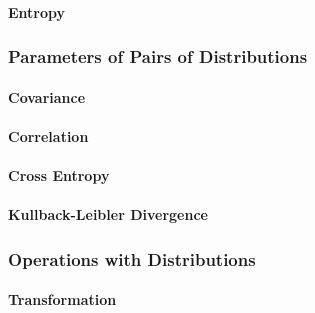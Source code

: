 

\paragraph{Entropy}


\subsubsection{Parameters of Pairs of Distributions}

\paragraph{Covariance}

\paragraph{Correlation}

\paragraph{Cross Entropy}

\paragraph{Kullback-Leibler Divergence}




\subsubsection{Operations with Distributions}


\paragraph{Transformation}


